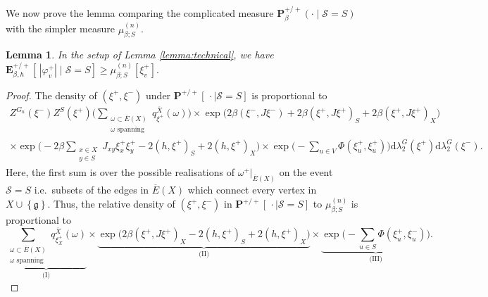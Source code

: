 \documentclass{article}
\newtheorem{lemma}[theorem]{Lemma}
\numberwithin{equation}{section}
\theoremstyle{definition}
\theoremstyle{definition}
\theoremstyle{remark}
\renewcommand{\d}{\mathrm{d}}
\newcommand{\E}{\mathbb{E}}
\newcommand\vp{\varphi}
\renewcommand{\d}{\mathrm{d}}
\newcommand{\w}{\omega}
\renewcommand{\l}{\lambda}
\newcommand{\I}{\Phi}
\renewcommand{\P}{\mathrm{\mathbf{P}}}
\renewcommand{\E}{\mathrm{\mathbf{E}}}
\renewcommand{\L}{\xi}
\renewcommand{\S}{\mathcal{S}}
\newcommand{\g}{\mathfrak{g}}
\begin{document}
We now prove the lemma comparing the complicated measure $\P^{+ / +}_{\beta}( \cdot \mid \S = S)$ with the simpler measure $\mu_{\beta;S}^{(n)}$.
\begin{lemma}\label{lemma:prelimlem}
In the setup of Lemma \ref{lemma:technical}, we have $\E^{ + / +}_{\beta,h}\left[ \, |\vp^+_v| \mid \S = S \right] \geq \mu_{\beta;S}^{(n)}\left[ \L^+_v \right].$ \end{lemma}
\begin{proof}
	The density of $(\L^+,\L^-)$ under $\P^{+ / +}\left[\,\cdot \mid \S = S \right]$  is proportional to
	\begin{multline}\label{eq:compden}
		Z^{G_n}(\L^-) Z^{S}(\L^+) \Big( \sum_{\substack{ \w \subset \overline{E}(X) \\ \w \text{ spanning}}} q_{\L^+}^{ \overline{X}}(\w) \Big )  \times \exp \big( 2\beta(\L^-,J\L^-) + 2\beta(\L^+,J\L^+)_S + 2\beta(\L^+,J\L^+)_X\big) \\ \times \exp\Big( - 2\beta \textstyle\sum_{\substack{x \in X \\ y \in S}} J_{xy} \L^+_x \L^+_y - 2(h,\L^+)_S + 2(h,\L^+)_X\Big)  \times \exp\big(- \sum_{u \in V} \I(\L^+_u,\L^+_u)\big) \d\l^G_2(\L^+) \d\l_2^G(\L^-).
	\end{multline}
	Here, the first sum is over the possible realisations of $\w^+|_{ \overline{E}(X)}$ on the event $\S = S$ i.e.~subsets of the edges in $ \overline{E}(X)$ which connect every vertex in $X \cup \left\{ \g \right\} $.
	Thus, the relative density of $(\L^+,\L^-)$ in $ \P^{+ / +}\left[ \,\cdot \mid \S = S \right]$ to $\mu_{\beta;S}^{(n)}$ is proportional to
	\begin{equation}\label{eq:relden}
		\underbrace{ \sum_{\substack{\w \subset \overline{E}(X) \\ \w \text{ spanning}}} q_{\L^+_X}^{ \overline{X}}(\w) }_{\text{(I)}} \times \underbrace{ \exp \big( 2\beta(\L^+,J\L^+)_X -2(h,\L^+)_S + 2(h,\L^+)_X\big)}_{\text{(II)}}  \times \underbrace{\exp\big( - \textstyle\sum_{u \in S}\I(\L^+_u,\L^-_u) \big)}_{\text{(III)}}. 
	\end{equation} 
	

\end{proof}
\end{document}
